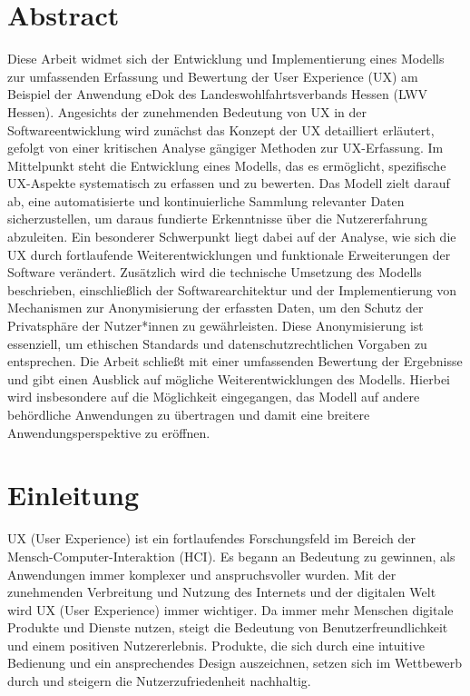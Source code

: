 \documentclass[12pt,oneside]{article}
\begin{document}
\section{Abstract}
   Diese Arbeit widmet sich der Entwicklung und Implementierung eines Modells zur umfassenden Erfassung und Bewertung der User Experience (UX) am Beispiel der Anwendung eDok des Landeswohlfahrtsverbands Hessen (LWV Hessen). Angesichts der zunehmenden Bedeutung von UX
in der Softwareentwicklung wird zunächst das Konzept der UX detailliert erläutert, gefolgt von einer kritischen Analyse gängiger Methoden zur UX-Erfassung. Im Mittelpunkt steht die Entwicklung eines Modells, das es ermöglicht, spezifische UX-Aspekte systematisch zu erfassen und zu bewerten. 
Das Modell zielt darauf ab, eine automatisierte und kontinuierliche Sammlung relevanter Daten sicherzustellen, um daraus fundierte Erkenntnisse über die Nutzererfahrung abzuleiten. Ein besonderer Schwerpunkt liegt dabei auf der Analyse, wie sich die UX durch fortlaufende Weiterentwicklungen und funktionale Erweiterungen der Software verändert.
 Zusätzlich wird die technische Umsetzung des Modells beschrieben, einschließlich der Softwarearchitektur und der Implementierung von Mechanismen zur Anonymisierung der erfassten Daten, um den Schutz der Privatsphäre der Nutzer*innen zu gewährleisten. Diese Anonymisierung ist essenziell, um ethischen Standards und datenschutzrechtlichen 
Vorgaben zu entsprechen. Die Arbeit schließt mit einer umfassenden Bewertung der Ergebnisse und gibt einen Ausblick auf mögliche Weiterentwicklungen des Modells. Hierbei wird insbesondere auf die Möglichkeit eingegangen, das Modell auf andere behördliche Anwendungen zu übertragen und damit eine breitere Anwendungsperspektive zu eröffnen.
\section{Einleitung}
UX (User Experience) ist ein fortlaufendes Forschungsfeld im Bereich der Mensch-Computer-Interaktion (HCI). Es begann an Bedeutung zu gewinnen, als Anwendungen immer komplexer und anspruchsvoller wurden. Mit der zunehmenden Verbreitung und Nutzung des Internets und der digitalen Welt wird UX (User Experience) immer wichtiger. Da immer mehr Menschen digitale Produkte und Dienste nutzen, steigt die Bedeutung von Benutzerfreundlichkeit und einem positiven Nutzererlebnis. Produkte, die sich durch eine intuitive Bedienung und ein ansprechendes Design auszeichnen, setzen sich im Wettbewerb durch und steigern die Nutzerzufriedenheit nachhaltig.
\end{document}
